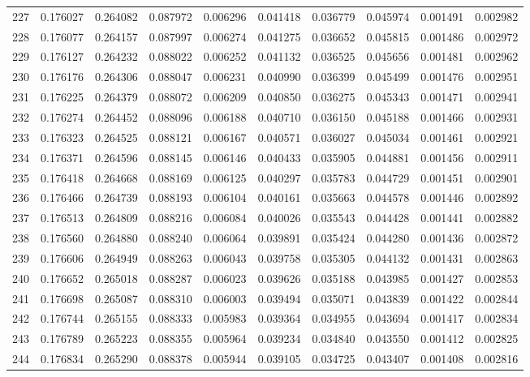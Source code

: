 \begin{tabular}{lrrrrrrrrr}
227 & 0.176027 & 0.264082 & 0.087972 & 0.006296 & 0.041418 & 0.036779 & 0.045974 & 0.001491 & 0.002982 \\
228 & 0.176077 & 0.264157 & 0.087997 & 0.006274 & 0.041275 & 0.036652 & 0.045815 & 0.001486 & 0.002972 \\
229 & 0.176127 & 0.264232 & 0.088022 & 0.006252 & 0.041132 & 0.036525 & 0.045656 & 0.001481 & 0.002962 \\
230 & 0.176176 & 0.264306 & 0.088047 & 0.006231 & 0.040990 & 0.036399 & 0.045499 & 0.001476 & 0.002951 \\
231 & 0.176225 & 0.264379 & 0.088072 & 0.006209 & 0.040850 & 0.036275 & 0.045343 & 0.001471 & 0.002941 \\
232 & 0.176274 & 0.264452 & 0.088096 & 0.006188 & 0.040710 & 0.036150 & 0.045188 & 0.001466 & 0.002931 \\
233 & 0.176323 & 0.264525 & 0.088121 & 0.006167 & 0.040571 & 0.036027 & 0.045034 & 0.001461 & 0.002921 \\
234 & 0.176371 & 0.264596 & 0.088145 & 0.006146 & 0.040433 & 0.035905 & 0.044881 & 0.001456 & 0.002911 \\
235 & 0.176418 & 0.264668 & 0.088169 & 0.006125 & 0.040297 & 0.035783 & 0.044729 & 0.001451 & 0.002901 \\
236 & 0.176466 & 0.264739 & 0.088193 & 0.006104 & 0.040161 & 0.035663 & 0.044578 & 0.001446 & 0.002892 \\
237 & 0.176513 & 0.264809 & 0.088216 & 0.006084 & 0.040026 & 0.035543 & 0.044428 & 0.001441 & 0.002882 \\
238 & 0.176560 & 0.264880 & 0.088240 & 0.006064 & 0.039891 & 0.035424 & 0.044280 & 0.001436 & 0.002872 \\
239 & 0.176606 & 0.264949 & 0.088263 & 0.006043 & 0.039758 & 0.035305 & 0.044132 & 0.001431 & 0.002863 \\
240 & 0.176652 & 0.265018 & 0.088287 & 0.006023 & 0.039626 & 0.035188 & 0.043985 & 0.001427 & 0.002853 \\
241 & 0.176698 & 0.265087 & 0.088310 & 0.006003 & 0.039494 & 0.035071 & 0.043839 & 0.001422 & 0.002844 \\
242 & 0.176744 & 0.265155 & 0.088333 & 0.005983 & 0.039364 & 0.034955 & 0.043694 & 0.001417 & 0.002834 \\
243 & 0.176789 & 0.265223 & 0.088355 & 0.005964 & 0.039234 & 0.034840 & 0.043550 & 0.001412 & 0.002825 \\
244 & 0.176834 & 0.265290 & 0.088378 & 0.005944 & 0.039105 & 0.034725 & 0.043407 & 0.001408 & 0.002816 \\

\end{tabular}
